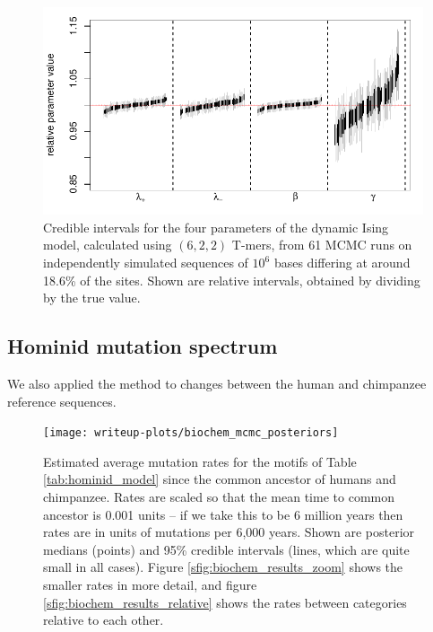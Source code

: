 \documentclass{article}
\theoremstyle{plain}
\theoremstyle{definition}
\begin{document}
\begin{figure}
    \begin{center}
        \includegraphics{writeup-plots/coverage_results}
    \end{center}
    \caption{
        Credible intervals for the four parameters of the dynamic Ising model,
        calculated using $(6,2,2)$ T-mers,
        from 61 MCMC runs on independently simulated sequences of $10^6$ bases
        differing at around 18.6\% of the sites.
        Shown are relative intervals, obtained by dividing by the true value.
        \label{fig:ising_coverage}}
\end{figure}


\subsection{Hominid mutation spectrum}

We also applied the method to changes between the human and chimpanzee reference sequences.


\begin{figure}
    \begin{center}
        \texttt{[image: writeup-plots/biochem\_mcmc\_posteriors]}
    \end{center}
    \caption{
        Estimated average mutation rates
        for the motifs of Table \ref{tab:hominid_model}
        since the common ancestor of humans and chimpanzee.
        Rates are scaled so that the mean time to common ancestor is 0.001 units --
        if we take this to be 6 million years \citep{scally2012insights,langergraber2012generation}
        then rates are in units of mutations per 6,000 years.
        Shown are posterior medians (points) and 95\% credible intervals (lines, which are quite small in all cases).
        Figure \ref{sfig:biochem_results_zoom} shows the smaller rates in more detail,
        and figure \ref{sfig:biochem_results_relative} shows the rates between categories relative to each other.
        \label{fig:biochem_results}}
\end{figure}
\end{document}
